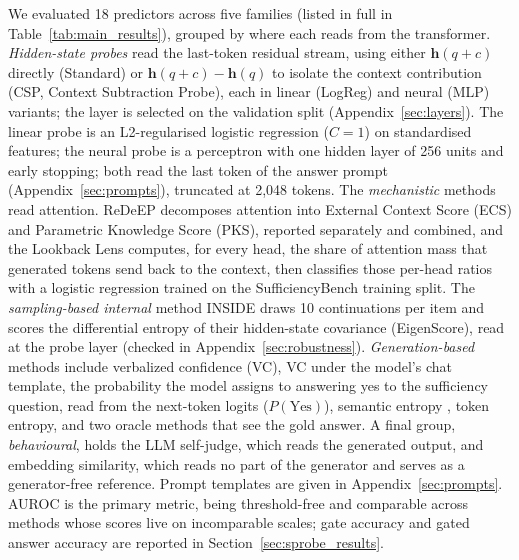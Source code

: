 \documentclass[acmsmall,screen,review]{acmart}
\newcommand{\bench}{SufficiencyBench}
\begin{document}
We evaluated 18 predictors across five families (listed in full in Table~\ref{tab:main_results}), grouped by where each reads from the transformer. \textit{Hidden-state probes} read the last-token residual stream, using either $\mathbf{h}(q{+}c)$ directly (Standard) or $\mathbf{h}(q{+}c) - \mathbf{h}(q)$ to isolate the context contribution (CSP, Context Subtraction Probe), each in linear (LogReg) and neural (MLP) variants; the layer is selected on the validation split (Appendix~\ref{sec:layers}). The linear probe is an L2-regularised logistic regression ($C = 1$) on standardised features; the neural probe is a perceptron with one hidden layer of 256 units and early stopping; both read the last token of the answer prompt (Appendix~\ref{sec:prompts}), truncated at 2,048 tokens. The \textit{mechanistic} methods read attention. ReDeEP \citep{sun2025redeep} decomposes attention into External Context Score (ECS) and Parametric Knowledge Score (PKS), reported separately and combined, and the Lookback Lens \citep{chuang2024lookback} computes, for every head, the share of attention mass that generated tokens send back to the context, then classifies those per-head ratios with a logistic regression trained on the \bench{} training split. The \textit{sampling-based internal} method INSIDE \citep{chen2024inside} draws 10 continuations per item and scores the differential entropy of their hidden-state covariance (EigenScore), read at the probe layer (checked in Appendix~\ref{sec:robustness}). \textit{Generation-based} methods include verbalized confidence (VC), VC under the model's chat template, the probability the model assigns to answering yes to the sufficiency question, read from the next-token logits ($P(\text{Yes})$), semantic entropy \citep{farquhar2024semantic}, token entropy, and two oracle methods that see the gold answer. A final group, \textit{behavioural}, holds the LLM self-judge, which reads the generated output, and embedding similarity, which reads no part of the generator and serves as a generator-free reference. Prompt templates are given in Appendix~\ref{sec:prompts}. AUROC \citep{hanley1982meaning} is the primary metric, being threshold-free and comparable across methods whose scores live on incomparable scales; gate accuracy and gated answer accuracy are reported in Section~\ref{sec:sprobe_results}.
\end{document}
